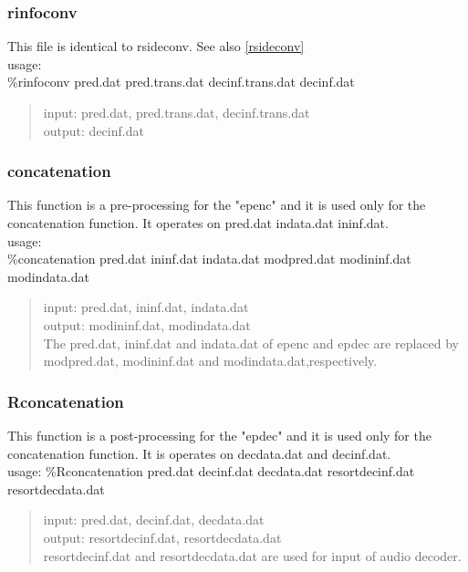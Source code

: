 \documentclass[a4paper]{article}
\begin{document}
\subsubsection{rinfoconv}
This file is identical to rsideconv. See also \ref{rsideconv}\\
usage: \\
\%rinfoconv pred.dat pred.trans.dat decinf.trans.dat decinf.dat
\begin{quote}
  input: pred.dat, pred.trans.dat, decinf.trans.dat\\
  output: decinf.dat
\end{quote}

\subsubsection{concatenation}
  This function is a pre-processing for the "epenc" and it is used only for the concatenation function. It operates on pred.dat indata.dat ininf.dat.\\
  usage: \\
  \%concatenation pred.dat ininf.dat indata.dat modpred.dat modininf.dat modindata.dat
\begin{quote}
  input: pred.dat, ininf.dat, indata.dat\\
  output: modininf.dat, modindata.dat\\
  The pred.dat, ininf.dat and indata.dat of epenc and epdec are replaced
  by modpred.dat, modininf.dat and modindata.dat,respectively.
\end{quote}

\subsubsection{Rconcatenation}
  This function is a post-processing for the "epdec" and it is used only for the concatenation function. It is operates on decdata.dat and decinf.dat.\\
  usage: \%Rconcatenation pred.dat decinf.dat decdata.dat
  resortdecinf.dat resortdecdata.dat
\begin{quote}
  input: pred.dat, decinf.dat, decdata.dat\\
  output: resortdecinf.dat, resortdecdata.dat\\
  resortdecinf.dat and resortdecdata.dat are used for input of audio
  decoder.
\end{quote}
\end{document}
